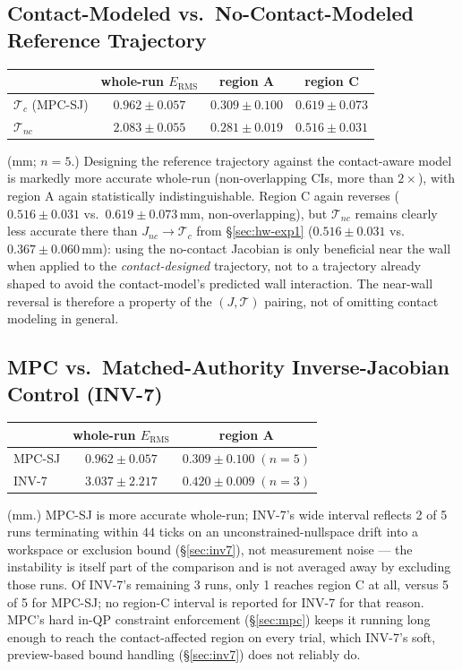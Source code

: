 \documentclass[journal]{IEEEtran}
\begin{document}
\subsection{Contact-Modeled vs.\ No-Contact-Modeled Reference Trajectory}
\label{sec:hw-exp3}

\begin{center}
\begin{tabular}{@{}lccc@{}}
\toprule
& whole-run $E_{\mathrm{RMS}}$ & region A & region C \\
\midrule
$\mathcal{T}_c$ (MPC-SJ) & $0.962\pm0.057$ & $0.309\pm0.100$ & $0.619\pm0.073$ \\
$\mathcal{T}_{nc}$ & $2.083\pm0.055$ & $0.281\pm0.019$ & $0.516\pm0.031$ \\
\bottomrule
\end{tabular}
\end{center}
(mm; $n=5$.) Designing the reference trajectory against the
contact-aware model is markedly more accurate whole-run
(non-overlapping CIs, more than $2\times$), with region A again
statistically indistinguishable. Region C again reverses
($0.516\pm0.031$ vs.\ $0.619\pm0.073\,\mathrm{mm}$, non-overlapping),
but $\mathcal{T}_{nc}$ remains clearly less accurate there than
$J_{nc}\!\to\!\mathcal{T}_c$ from \S\ref{sec:hw-exp1}
($0.516\pm0.031$ vs.\ $0.367\pm0.060\,\mathrm{mm}$): using the
no-contact Jacobian is only beneficial near the wall when applied to
the \emph{contact-designed} trajectory, not to a trajectory already
shaped to avoid the contact-model's predicted wall interaction. The
near-wall reversal is therefore a property of the $(J,\mathcal{T})$
pairing, not of omitting contact modeling in general.

\subsection{MPC vs.\ Matched-Authority Inverse-Jacobian Control (INV-7)}
\label{sec:hw-exp4}

\begin{center}
\begin{tabular}{@{}lcc@{}}
\toprule
& whole-run $E_{\mathrm{RMS}}$ & region A \\
\midrule
MPC-SJ & $0.962\pm0.057$ & $0.309\pm0.100\;(n{=}5)$ \\
INV-7 & $3.037\pm2.217$ & $0.420\pm0.009\;(n{=}3)$ \\
\bottomrule
\end{tabular}
\end{center}
(mm.) MPC-SJ is more accurate whole-run; INV-7's wide interval reflects
2 of 5 runs terminating within $44$ ticks on an unconstrained-nullspace
drift into a workspace or exclusion bound (\S\ref{sec:inv7}), not
measurement noise --- the instability is itself part of the
comparison and is not averaged away by excluding those runs. Of
INV-7's remaining 3 runs, only 1 reaches region C at all, versus 5 of
5 for MPC-SJ; no region-C interval is reported for INV-7 for that
reason. MPC's hard in-QP constraint enforcement (\S\ref{sec:mpc})
keeps it running long enough to reach the contact-affected region on
every trial, which INV-7's soft, preview-based bound handling
(\S\ref{sec:inv7}) does not reliably do.
\end{document}
